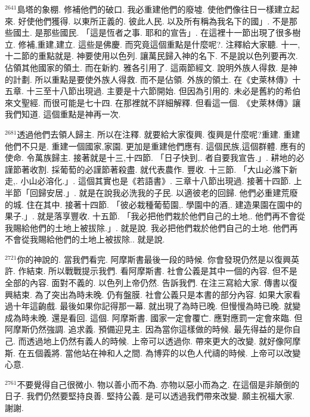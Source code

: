 \documentclass{book}
\begin{document}
$^{2641}$島塔的象棚.
修補他們的破口.
我必重建他們的廢墟.
使他們像往日一樣建立起來.
好使他們獲得.
以東所正義的.
彼此人民.
以及所有稱為我名下的國」.
不是那些國土.
是那些國民.
「這是恆者之事.
耶和的宣告」.
在這裡十一節出現了很多樹立.
修補,重建,建立.
這些是佛慶.
而究竟這個重點是什麼呢?.
注釋給大家聽.
十一,十二節的重點就是.
神要使用以色列.
讓萬民歸入神的名下.
不是說以色列要再次.
佔領其他國家的領土.
而在新約.
雅各引用了.
這兩節經文.
說明外族人得救.
是神的計劃.
所以重點是要使外族人得救.
而不是佔領.
外族的領土.
在《史萊林傳》十五章.
十三至十八節出現過.
主要是十六節開始.
但因為引用的.
未必是舊約的希伯來文聖經.
而很可能是七十四.
在那裡就不詳細解釋.
但看這一個.
《史萊林傳》讓我們知道.
這個重點是神再一次.

$^{2681}$透過他們去領人歸主.
所以在注釋.
就要給大家復興.
復興是什麼呢?重建.
重建他們不只是.
重建一個國家,家園.
更加是重建他們應有.
這個民族,這個群體.
應有的使命.
令萬族歸主.
接著就是十三,十四節.
「日子快到,.
者自要我宣告.」.
耕地的必謹節著收割.
採葡萄的必謹節著殺盡.
就代表農作.
豐收.
十三節.
「大山必滌下新走,.
小山必溶化.」.
這個其實也是《若語書》.
三章十八節出現過.
接著十四節.
上半節「回歸安居.」.
就是在說我必洗我的子民.
以適彼老的回歸.
他們必重建荒廢的城.
住在其中.
接著十四節.
「彼必栽種葡萄園,.
學園中的酒,.
建造果園在園中的果子.」.
就是落享豐收.
十五節.
「我必把他們栽於他們自己的土地,.
他們再不會從我賜給他們的土地上被拔除.」.
就是說.
我必把他們栽於他們自己的土地.
他們再不會從我賜給他們的土地上被拔除..
就是說.

$^{2721}$你的神說的.
當我們看完.
阿摩斯書最後一段的時候.
你會發現仍然是以復興英許.
作結束.
所以戰戰提示我們.
看阿摩斯書.
社會公義是其中一個的內容.
但不是全部的內容.
面對不義的.
以色列上帝仍然.
告訴我們.
在注三寫給大家.
傳書以復興結束.
為了突出為時未晚.
仍有盤膜.
社會公義只是本書的部分內容.
如果大家看過十年這齣戲.
最後如果你記得那一幕.
就出現了為時已晚.
但慢慢為時已晚.
就變成為時未晚.
還是看回.
這個.
阿摩斯書.
國家一定會覆亡.
應對應罰一定會來臨.
但阿摩斯仍然強調.
追求義.
預備迎見主.
因為當你這樣做的時候.
最先得益的是你自己.
而透過地上仍然有義人的時候.
上帝可以透過你.
帶來更大的改變.
就好像阿摩斯.
在五個義將.
當他站在神和人之間.
為博弈的以色人代禱的時候.
上帝可以改變心意.

$^{2761}$不要覺得自己很微小.
物以善小而不為.
亦物以惡小而為之.
在這個是非顛倒的日子.
我們仍然要堅持良善.
堅持公義.
是可以透過我們帶來改變.
願主祝福大家.
謝謝.
\newpage
\end{document}
